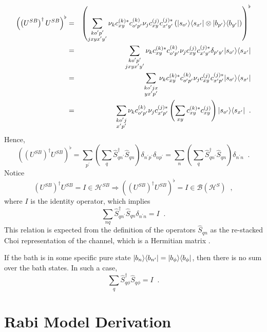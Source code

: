\begin{eqnarray*}
\left(\left(U^{SB}\right)^\dagger U^{SB}\right)^\flat &=&\left(\sum_{\substack{ko^\prime p^\prime\\jxyx^\prime y^\prime}} \nu_k c_{xy}^{(k)*}c_{o^\prime p^\prime}^{(k)}\nu_j c_{xy}^{(j)}c_{x^\prime y^\prime}^{(j)*}\left(|s_{o^\prime}\rangle\langle s_{x^\prime}|\otimes|b_{p^\prime}\rangle\langle b_{y^\prime}|\right)\right)^\flat\\
&=&\sum_{\substack{ko^\prime p^\prime\\jxyx^\prime y^\prime}} \nu_k c_{xy}^{(k)*}c_{o^\prime p^\prime}^{(k)}\nu_j c_{xy}^{(j)}c_{x^\prime y^\prime}^{(j)*}\delta_{p^\prime y^\prime}|s_{o^\prime}\rangle\langle s_{x^\prime}|\\
&=&\sum_{\substack{ko^\prime jx\\yx^\prime p^\prime}} \nu_k c_{xy}^{(k)*}c_{o^\prime p^\prime}^{(k)}\nu_j c_{xy}^{(j)}c_{x^\prime p^\prime}^{(j)*}|s_{o^\prime}\rangle\langle s_{x^\prime}|\\
&=& \sum_{\substack{ko^\prime j\\x^\prime p^\prime}} \nu_k c_{o^\prime p^\prime}^{(k)}\nu_j c_{x^\prime p^\prime}^{(j)*}\left(\sum_{xy} c_{xy}^{(k)*} c_{xy}^{(j)}\right) |s_{o^\prime}\rangle\langle s_{x^\prime}|\;\;.
\end{eqnarray*}
Hence,
$$
\left(\left(U^{SB}\right)^\dagger U^{SB}\right)^\flat = \sum_{p^\prime}\left(\sum_q \hat{S}_{qn^\prime}^\dagger \hat{S}_{qn}\right)\delta_{n^\prime p^\prime}\delta_{np^\prime} = \sum_{n}\left(\sum_q \hat{S}_{qn^\prime}^\dagger \hat{S}_{qn}\right)\delta_{n^\prime n}\;\;.
$$
Notice
$$
\left(U^{SB}\right)^\dagger U^{SB} = I\in\mathcal{H}^{SB}\Rightarrow \left(\left(U^{SB}\right)^\dagger U^{SB}\right)^\flat = I\in\mathcal{B}(\mathcal{H}^S)\;\;,
$$
where $I$ is the identity operator, which implies
$$
\sum_{nq} \hat{S}_{qn^\prime}^\dagger \hat{S}_{qn}\delta_{n^\prime n} = I\;\;.
$$
This relation is expected from the definition of the operators $\hat{S}_{qn}$ as the re-stacked Choi representation of the channel, which is a Hermitian matrix \cite{Choi1975}.

If the bath is in some specific pure state $|b_n\rangle\langle b_{n^\prime}|=|b_\phi\rangle\langle b_{\phi}|$, then there is no sum over the bath states.  In such a case,
$$
\sum_{q} \hat{S}_{q\phi}^\dagger \hat{S}_{q\phi} = I\;\;.
$$

\section{Rabi Model Derivation}
\label{sec:rabimodelder}

